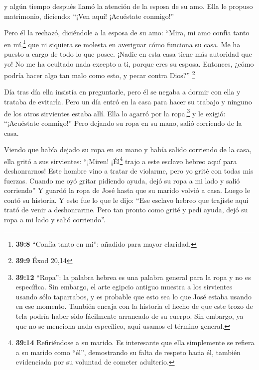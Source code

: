  y algún tiempo después llamó la atención de la esposa de
su amo. Ella le propuso matrimonio, diciendo: ``¡Ven aquí! ¡Acuéstate
conmigo!''

 Pero él la rechazó, diciéndole a la esposa de su amo:
``Mira, mi amo confía tanto en mí,\footnote{\textbf{39:8} ``Confía tanto
  en mi'': añadido para mayor claridad.} que ni siquiera se molesta en
averiguar cómo funciona su casa. Me ha puesto a cargo de todo lo que
posee.  ¡Nadie en esta casa tiene más autoridad que yo! No
me ha ocultado nada excepto a ti, porque eres su esposa. Entonces, ¿cómo
podría hacer algo tan malo como esto, y pecar contra Dios?'' \footnote{\textbf{39:9}
  Éxod 20,14}

 Día tras día ella insistía en preguntarle, pero él se
negaba a dormir con ella y trataba de evitarla.  Pero un
día entró en la casa para hacer su trabajo y ninguno de los otros
sirvientes estaba allí.  Ella lo agarró por la
ropa,\footnote{\textbf{39:12} ``Ropa'': la palabra hebrea es una palabra
  general para la ropa y no es específica. Sin embargo, el arte egipcio
  antiguo muestra a los sirvientes usando sólo taparrabos, y es probable
  que esto sea lo que José estaba usando en ese momento. También encaja
  con la historia el hecho de que este trozo de tela podría haber sido
  fácilmente arrancado de su cuerpo. Sin embargo, ya que no se menciona
  nada específico, aquí usamos el término general.} y le exigió:
``¡Acuéstate conmigo!'' Pero dejando su ropa en su mano, salió corriendo
de la casa.

 Viendo que había dejado su ropa en su mano y había
salido corriendo de la casa,  ella gritó a sus
sirvientes: ``¡Miren! ¡Él\footnote{\textbf{39:14} Refiriéndose a su
  marido. Es interesante que ella simplemente se refiera a su marido
  como ``él'', demostrando su falta de respeto hacia él, también
  evidenciada por su voluntad de cometer adulterio.} trajo a este
esclavo hebreo aquí para deshonrarnos! Este hombre vino a tratar de
violarme, pero yo grité con todas mis fuerzas.  Cuando me
oyó gritar pidiendo ayuda, dejó su ropa a mi lado y salió corriendo''
 Y guardó la ropa de José hasta que su marido volvió a
casa.  Luego le contó su historia. Y esto fue lo que le
dijo: ``Ese esclavo hebreo que trajiste aquí trató de venir a
deshonrarme.  Pero tan pronto como grité y pedí ayuda,
dejó su ropa a mi lado y salió corriendo''.

